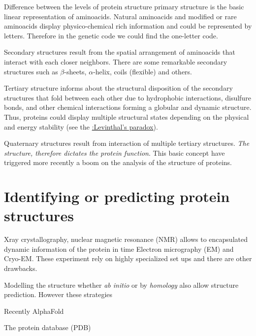 \documentclass[
  letterpaper,
  DIV=11,
  numbers=noendperiod,
  oneside]{scrreprt}
\begin{document}
Difference between the levels of protein structure primary structure is
the basic linear representation of aminoacids. Natural aminoacids and
modified or rare aminoacids display physico-chemical rich information
and could be represented by letters. Therefore in the genetic code we
could find the one-letter code.

Secondary structures result from the spatial arrangement of aminoacids
that interact with each closer neighbors. There are some remarkable
secondary structures such as \(\beta\)-sheets, \(\alpha\)-helix, coils
(flexible) and others.

Tertiary structure informs about the structural disposition of the
secondary structures that fold between each other due to hydrophobic
interactions, disulfure bonds, and other chemical interactions forming a
globular and dynamic structure. Thus, proteins could display multiple
structural states depending on the physical and energy stability (see
the
\href{https://en.wikipedia.org/wiki/Levinthal\%27s_paradox}{:Levinthal's
paradox}).

Quaternary structures result from interaction of multiple tertiary
structures. \emph{The structure, therefore dictates the protein
function}. This basic concept have triggered more recently a boom on the
analysis of the structure of proteins.

\hypertarget{identifying-or-predicting-protein-structures}{%
\section{Identifying or predicting protein
structures}\label{identifying-or-predicting-protein-structures}}

Xray crystallography, nuclear magnetic resonance (NMR) allows to
encapsulated dynamic information of the protein in time Electron
micrography (EM) and Cryo-EM. These experiment rely on highly
specialized set ups and there are other drawbacks.

{}

Modelling the structure whether \emph{ab initio} or by \emph{homology}
also allow structure prediction. However these strategies

Recently AlphaFold

The protein database (PDB)
\end{document}
